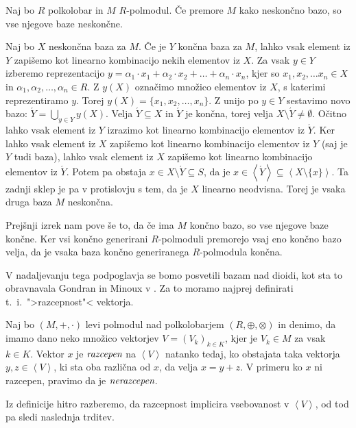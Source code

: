 \documentclass[mat1]{fmfdelo}
\newcommand{\pojem}[1]{\ensuremath{\emph{#1}}}
\newcommand{\Gen}[1]{\ensuremath{\left<{#1}\right>}}
\begin{document}
\begin{izrek}
	Naj bo $R$ polkolobar in $M$ $R$-polmodul. Če premore $M$ kako neskončno bazo, so vse njegove baze neskončne.
\end{izrek}
\begin{dokaz}
	Naj bo $X$ neskončna baza za $M$. Če je $Y$ končna baza za $M$, lahko vsak element iz $Y$ zapišemo kot linearno kombinacijo nekih elementov iz $X$. Za vsak $y\in Y$ izberemo reprezentacijo $y = \alpha_1\cdot x_1 + \alpha_2\cdot x_2 + \ldots + \alpha_n\cdot x_n$, kjer so $x_1, x_2, \ldots x_n \in X$ in $\alpha_1, \alpha_2, \ldots, \alpha_n \in R$. Z $y(X)$ označimo množico elementov iz $X$, s katerimi reprezentiramo $y$. Torej $y(X) = \{x_1, x_2, \ldots, x_n\}$. Z unijo po $y\in Y$ sestavimo novo bazo: $\acute{Y} = \bigcup_{y\in Y}y(X)$. Velja $\acute{Y} \subseteq X$ in $\acute{Y}$ je končna, torej velja $X\setminus\acute{Y}\neq\emptyset$. Očitno lahko vsak element iz $Y$ izrazimo kot linearno kombinacijo elementov iz $\acute{Y}$. Ker lahko vsak element iz $X$ zapišemo kot linearno kombinacijo elementov iz $Y$ (saj je $Y$ tudi baza), lahko vsak element iz $X$ zapišemo kot linearno kombinacijo elementov iz $\acute{Y}$. Potem pa obstaja $x\in X\setminus\acute{Y} \subseteq S$, da je $x\in \Gen{\acute{Y}}\subseteq\Gen{X\setminus\{x\}}$. Ta zadnji sklep je pa v protislovju s tem, da je $X$ linearno neodvisna. Torej je vsaka druga baza $M$ neskončna.
\end{dokaz}

	Prejšnji izrek nam pove še to, da če ima $M$ končno bazo, so vse njegove baze končne. Ker vsi končno generirani $R$-polmoduli premorejo vsaj eno končno bazo velja, da je vsaka baza končno generiranega $R$-polmodula končna.

V nadaljevanju tega podpoglavja se bomo posvetili bazam nad dioidi, kot sta to obravnavala Gondran in Minoux v \cite[poglavje 5.\,2.\,5.\,]{bib:Gondran}. Za to moramo najprej definirati t.~i.\  ">razcepnost"< vektorja.
\begin{definicija}
	Naj bo $(M, +,\cdot)$ levi polmodul nad polkolobarjem $(R, \oplus, \otimes)$ in denimo, da imamo dano neko množico vektorjev $V = (V_k)_{k\in K}$, kjer je $V_k\in M$ za vsak $k\in K$. Vektor $x$ je \pojem{razcepen} na \Gen{V} natanko tedaj, ko obstajata taka vektorja $y, z\in \Gen{V}$, ki sta oba različna od $x$, da velja $x = y + z$. V primeru ko $x$ ni razcepen, pravimo da je \pojem{nerazcepen}.
\end{definicija}

Iz definicije hitro razberemo, da razcepnost implicira vsebovanost v \Gen{V}, od tod pa sledi naslednja trditev.
	
\end{document}
